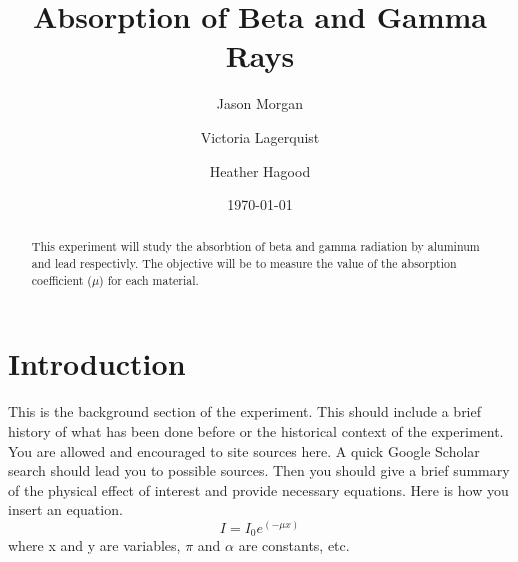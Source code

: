 \documentclass[twocolumn,secnumarabic,amssymb, nobibnotes, aps, pra]{revtex4}
\begin{document}
\title{Absorption of Beta and Gamma Rays
 }


\author{Jason Morgan}

\author{Victoria Lagerquist}

\author{Heather Hagood}




\date{\today}


\begin{abstract}
This experiment will study the absorbtion of beta and gamma radiation by aluminum and lead respectivly.  The objective will be to measure the value of the absorption coefficient ($\mu$) for each material.
\end{abstract}

\maketitle
\section{Introduction}

This is the background section of the experiment.  This should include a brief history of what has been done before or the historical context of the experiment. You are allowed and encouraged to site sources here.  A quick Google Scholar search should lead you to possible sources. Then you should give a brief summary of the physical effect of interest and provide necessary equations. Here is how you insert an equation. 
\begin{equation}
I = I_0 e^( -\mu x )
\label{Equationname}   %
\end{equation}
where x and y are variables, $\pi$ and $\alpha$ are constants, etc. 
\end{document}
